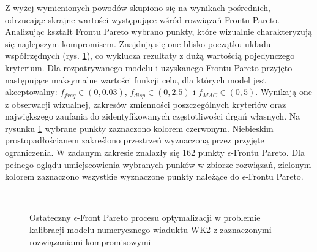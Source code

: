 Z wyżej wymienionych powodów skupiono się na wynikach pośrednich, odrzucając skrajne wartości występujące wśród rozwiązań Frontu Pareto. Analizując kształt Frontu Pareto wybrano punkty, które wizualnie charakteryzują się najlepszym kompromisem. Znajdują się one blisko początku układu współrzędnych (rys. \ref{fig: calibration_selected}), co wyklucza rezultaty z dużą wartością pojedynczego kryterium. Dla rozpatrywanego modelu i uzyskanego Frontu Pareto przyjęto następujące maksymalne wartości funkcji celu, dla których model jest akceptowalny: $f_{freq} \in (0,0.03)$, $f_{disp} \in (0,2.5)$ i $f_{MAC} \in (0,5)$. Wynikają one z obserwacji wizualnej, zakresów zmienności poszczególnych kryteriów oraz największego zaufania do zidentyfikowanych częstotliwości drgań własnych. Na rysunku \ref{fig: calibration_selected} wybrane punkty zaznaczono kolorem czerwonym. Niebieskim prostopadłościanem zakreślono przestrzeń wyznaczoną przez przyjęte ograniczenia. W zadanym zakresie znalazły się 162 punkty $\epsilon$-Frontu Pareto. Dla pełnego oglądu umiejscowienia wybranych punków w zbiorze rozwiązań, zielonym kolorem zaznaczono wszystkie wyznaczone punkty należące do $\epsilon$-Frontu Pareto. 

\begin{figure}[hbt!]
	\centering
	 \\
	\captionsetup{justification=centering}
	\caption{Ostateczny $\epsilon$-Front Pareto procesu optymalizacji w problemie kalibracji modelu numerycznego wiaduktu WK2 z zaznaczonymi rozwiązaniami kompromisowymi}
	\label{fig: calibration_selected}
\end{figure}


